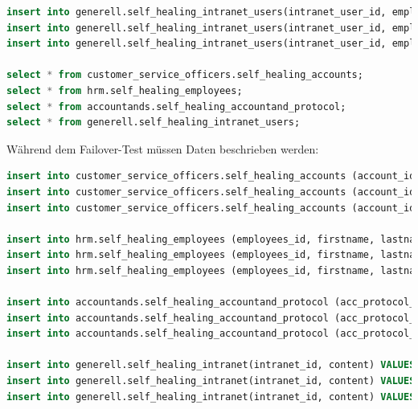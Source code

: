 \begin{lstlisting}[language=sql, caption=Patroni - Self Healing Tests - Init Data,captionpos=b,label={lst:patroni-self-healing-init-data},breaklines=true]
insert into generell.self_healing_intranet_users(intranet_user_id, employees_id) values(100, 100);
insert into generell.self_healing_intranet_users(intranet_user_id, employees_id) values(200, 200);
insert into generell.self_healing_intranet_users(intranet_user_id, employees_id) values(300, 300);

select * from customer_service_officers.self_healing_accounts;
select * from hrm.self_healing_employees;
select * from accountands.self_healing_accountand_protocol;
select * from generell.self_healing_intranet_users;
\end{lstlisting}

Während dem Failover-Test müssen Daten beschrieben werden:
\lstset{style=gra_codestyle}
\begin{lstlisting}[language=sql, caption=Patroni - Self Healing Tests - Failover Data,captionpos=b,label={lst:patroni-self-healing-failover-data},breaklines=true]
insert into customer_service_officers.self_healing_accounts (account_id, firstname, lastname, birthday) VALUES (400, 'i', 'j', '01.01.2005');
insert into customer_service_officers.self_healing_accounts (account_id, firstname, lastname, birthday) VALUES (500, 'k', 'l', '01.01.2003');
insert into customer_service_officers.self_healing_accounts (account_id, firstname, lastname, birthday) VALUES (600, 'm', 'n', '01.01.2001');

insert into hrm.self_healing_employees (employees_id, firstname, lastname, birthday) VALUES (400, 'i', 'j', '01.01.2005');
insert into hrm.self_healing_employees (employees_id, firstname, lastname, birthday) VALUES (500, 'k', 'l', '01.01.2003');
insert into hrm.self_healing_employees (employees_id, firstname, lastname, birthday) VALUES (600, 'm', 'n', '01.01.2001');

insert into accountands.self_healing_accountand_protocol (acc_protocol_id, description, protocol_date, employees_id, rapport)  values (400, 'bla', '07.04.2024', 200, 'blabla');
insert into accountands.self_healing_accountand_protocol (acc_protocol_id, description, protocol_date, employees_id, rapport)  values (500, 'yada', '07.04.2024', 600, 'ydayadyada');
insert into accountands.self_healing_accountand_protocol (acc_protocol_id, description, protocol_date, employees_id, rapport)  values (1000, 'something', '07.04.2024', 300, 'something');

insert into generell.self_healing_intranet(intranet_id, content) VALUES (200, 'yadada');
insert into generell.self_healing_intranet(intranet_id, content) VALUES (600, 'bla bla');
insert into generell.self_healing_intranet(intranet_id, content) VALUES (900, 'talking and talking');


\end{lstlisting}

